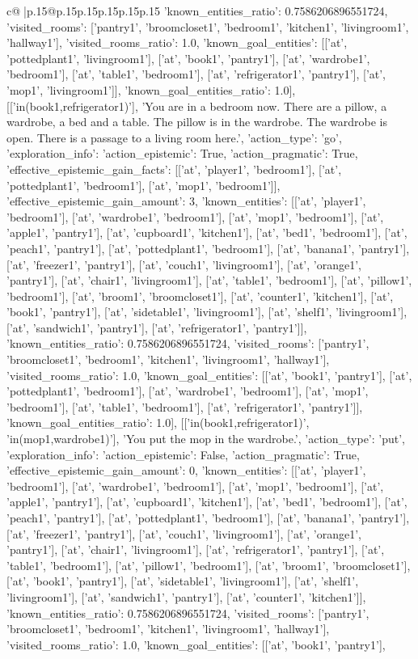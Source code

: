 \documentclass{article}
\begin{document}
{\begin{supertabular}{c@{$\;$}|p{.15\linewidth}@{}p{.15\linewidth}p{.15\linewidth}p{.15\linewidth}p{.15\linewidth}p{.15\linewidth}}
{{{'known_entities_ratio': 0.7586206896551724, 'visited_rooms': ['pantry1', 'broomcloset1', 'bedroom1', 'kitchen1', 'livingroom1', 'hallway1'], 'visited_rooms_ratio': 1.0, 'known_goal_entities': [['at', 'pottedplant1', 'livingroom1'], ['at', 'book1', 'pantry1'], ['at', 'wardrobe1', 'bedroom1'], ['at', 'table1', 'bedroom1'], ['at', 'refrigerator1', 'pantry1'], ['at', 'mop1', 'livingroom1']], 'known_goal_entities_ratio': 1.0}}], [['in(book1,refrigerator1)'], 'You are in a bedroom now. There are a pillow, a wardrobe, a bed and a table. The pillow is in the wardrobe. The wardrobe is open. There is a passage to a living room here.', {'action_type': 'go', 'exploration_info': {'action_epistemic': True, 'action_pragmatic': True, 'effective_epistemic_gain_facts': [['at', 'player1', 'bedroom1'], ['at', 'pottedplant1', 'bedroom1'], ['at', 'mop1', 'bedroom1']], 'effective_epistemic_gain_amount': 3, 'known_entities': [['at', 'player1', 'bedroom1'], ['at', 'wardrobe1', 'bedroom1'], ['at', 'mop1', 'bedroom1'], ['at', 'apple1', 'pantry1'], ['at', 'cupboard1', 'kitchen1'], ['at', 'bed1', 'bedroom1'], ['at', 'peach1', 'pantry1'], ['at', 'pottedplant1', 'bedroom1'], ['at', 'banana1', 'pantry1'], ['at', 'freezer1', 'pantry1'], ['at', 'couch1', 'livingroom1'], ['at', 'orange1', 'pantry1'], ['at', 'chair1', 'livingroom1'], ['at', 'table1', 'bedroom1'], ['at', 'pillow1', 'bedroom1'], ['at', 'broom1', 'broomcloset1'], ['at', 'counter1', 'kitchen1'], ['at', 'book1', 'pantry1'], ['at', 'sidetable1', 'livingroom1'], ['at', 'shelf1', 'livingroom1'], ['at', 'sandwich1', 'pantry1'], ['at', 'refrigerator1', 'pantry1']], 'known_entities_ratio': 0.7586206896551724, 'visited_rooms': ['pantry1', 'broomcloset1', 'bedroom1', 'kitchen1', 'livingroom1', 'hallway1'], 'visited_rooms_ratio': 1.0, 'known_goal_entities': [['at', 'book1', 'pantry1'], ['at', 'pottedplant1', 'bedroom1'], ['at', 'wardrobe1', 'bedroom1'], ['at', 'mop1', 'bedroom1'], ['at', 'table1', 'bedroom1'], ['at', 'refrigerator1', 'pantry1']], 'known_goal_entities_ratio': 1.0}}], [['in(book1,refrigerator1)', 'in(mop1,wardrobe1)'], 'You put the mop in the wardrobe.', {'action_type': 'put', 'exploration_info': {'action_epistemic': False, 'action_pragmatic': True, 'effective_epistemic_gain_amount': 0, 'known_entities': [['at', 'player1', 'bedroom1'], ['at', 'wardrobe1', 'bedroom1'], ['at', 'mop1', 'bedroom1'], ['at', 'apple1', 'pantry1'], ['at', 'cupboard1', 'kitchen1'], ['at', 'bed1', 'bedroom1'], ['at', 'peach1', 'pantry1'], ['at', 'pottedplant1', 'bedroom1'], ['at', 'banana1', 'pantry1'], ['at', 'freezer1', 'pantry1'], ['at', 'couch1', 'livingroom1'], ['at', 'orange1', 'pantry1'], ['at', 'chair1', 'livingroom1'], ['at', 'refrigerator1', 'pantry1'], ['at', 'table1', 'bedroom1'], ['at', 'pillow1', 'bedroom1'], ['at', 'broom1', 'broomcloset1'], ['at', 'book1', 'pantry1'], ['at', 'sidetable1', 'livingroom1'], ['at', 'shelf1', 'livingroom1'], ['at', 'sandwich1', 'pantry1'], ['at', 'counter1', 'kitchen1']], 'known_entities_ratio': 0.7586206896551724, 'visited_rooms': ['pantry1', 'broomcloset1', 'bedroom1', 'kitchen1', 'livingroom1', 'hallway1'], 'visited_rooms_ratio': 1.0, 'known_goal_entities': [['at', 'book1', 'pantry1'], }}}
\end{supertabular}}
\end{document}
